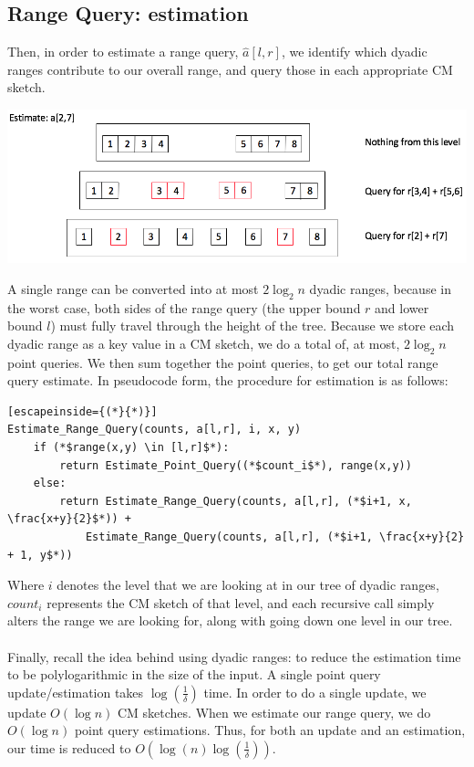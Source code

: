 \documentclass[11pt]{article}
\begin{document}
{\subsection{Range Query: estimation}
Then, in order to estimate a range query, $\hat a[l,r]$, we identify which
dyadic ranges contribute to our overall range, and query those in each
appropriate CM sketch.
\begin{center}\includegraphics[scale=0.3]{range_estimate.png}\end{center}
A single range can be converted into at most $2\log_2n$ dyadic ranges, because
in the worst case, both sides of the range query (the upper bound $r$ and lower
bound $l$)  must fully travel through the height of the tree. Because we store
each dyadic range as a key value in a CM sketch, we do a total of, at most,
$2\log_2n$ point queries. We then sum together the point queries, to get our
total range query estimate. In pseudocode form, the procedure for estimation is
as follows:
\begin{lstlisting}[escapeinside={(*}{*)}]
Estimate_Range_Query(counts, a[l,r], i, x, y) 
    if (*$range(x,y) \in [l,r]$*):
        return Estimate_Point_Query((*$count_i$*), range(x,y))
    else:
        return Estimate_Range_Query(counts, a[l,r], (*$i+1, x, \frac{x+y}{2}$*)) +
            Estimate_Range_Query(counts, a[l,r], (*$i+1, \frac{x+y}{2} + 1, y$*))
\end{lstlisting}
Where $i$ denotes the level that we are looking at in our tree of dyadic ranges,
$count_i$ represents the CM sketch of that level, and each recursive call simply
alters the range we are looking for, along with going down one level in our
tree.\\\\
Finally, recall the idea behind using dyadic ranges: to reduce the estimation
time to be polylogarithmic in the size of the input. A single point query
update/estimation takes $\log(\frac{1}{\delta})$ time. In order to do a single
update, we update $O(\log n)$ CM sketches. When we estimate our range query, we
do $O(\log n)$ point query estimations. Thus, for both an update and an
    estimation, our time is reduced to $O(\log(n)\log(\frac{1}{\delta}))$.
}
\end{document}
